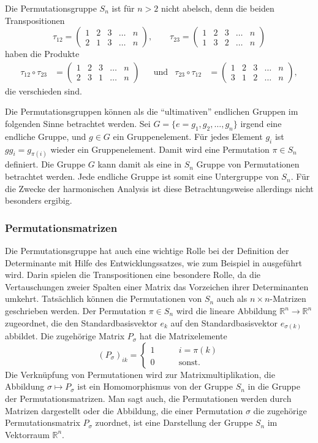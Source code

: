 Die Permutationsgruppe $S_n$ ist für $n>2$ nicht abelsch, denn die beiden
Transpositionen
\[
\tau_{12}
=
\begin{pmatrix}
1&2&3&\dots&n\\
2&1&3&\dots&n
\end{pmatrix}
,
\qquad
\tau_{23}
=
\begin{pmatrix}
1&2&3&\dots&n\\
1&3&2&\dots&n
\end{pmatrix}
\]
haben die Produkte
\begin{align*}
\tau_{12}
\circ
\tau_{23}
&=
\begin{pmatrix}
1&2&3&\dots&n\\
2&3&1&\dots&n
\end{pmatrix}
&&\text{und}&
\tau_{23}
\circ
\tau_{12}
&=
\begin{pmatrix}
1&2&3&\dots&n\\
3&1&2&\dots&n
\end{pmatrix},
\end{align*}
die verschieden sind.

Die Permutationsgruppen können als die ``ultimativen'' endlichen Gruppen
im folgenden Sinne betrachtet werden.
Sei $G=\{e=g_1,g_2,\dots,g_n\}$ irgend eine endliche Gruppe, und $g\in G$
ein Gruppenelement.
Für jedes Element $g_i$ ist $gg_i=g_{\pi(i)}$ wieder ein Gruppenelement.
Damit wird eine Permutation $\pi\in S_n$ definiert.
Die Gruppe $G$ kann damit als eine in $S_n$ Gruppe von Permutationen
betrachtet werden.
Jede endliche Gruppe ist somit eine Untergruppe von $S_n$.
Für die Zwecke der harmonischen Analysis ist diese Betrachtungsweise
allerdings nicht besonders ergibig.

%
%
\subsubsection{Permutationsmatrizen}
Die Permutationsgruppe hat auch eine wichtige Rolle bei der Definition
der Determinante mit Hilfe des Entwicklungssatzes, wie zum Beispiel
in \cite[Kapitel~4]{buch:linalg} ausgeführt wird.
Darin spielen die Transpositionen eine besondere Rolle, da die
Vertauschungen zweier Spalten einer Matrix das Vorzeichen ihrer
Determinanten umkehrt.
Tatsächlich können die Permutationen von $S_n$ auch als
$n\times n$-Matrizen geschrieben werden.
Der Permutation $\pi\in S_n$ wird die lineare Abbildung
$\mathbb{R}^n\to\mathbb{R}^n$ zugeordnet, die den Standardbasisvektor
$e_k$ auf den Standardbasisvektor $e_{\sigma(k)}$ abbildet.
Die zugehörige Matrix $P_\sigma$ hat die Matrixelemente
\[
(P_\sigma)_{ik} 
=
\begin{cases}
1&\qquad i = \pi(k)\\
0&\qquad\text{sonst}.
\end{cases}
\]
Die Verknüpfung von Permutationen wird zur Matrixmultiplikation,
die Abbildung $\sigma \mapsto P_\sigma$ ist ein Homomorphismus
von der Gruppe $S_n$ in die Gruppe der Permutationsmatrizen.
Man sagt auch, die Permutationen werden durch Matrizen dargestellt oder
die Abbildung, die einer Permutation $\sigma$ die zugehörige
Permutationsmatrix $P_\sigma$ zuordnet, ist eine Darstellung der
Gruppe $S_n$ im Vektorraum $\mathbb{R}^n$.

